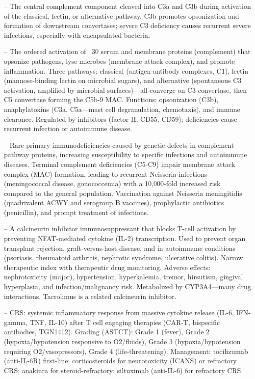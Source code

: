 -- The central complement component cleaved into C3a and C3b during activation of the classical, lectin, or alternative pathway. C3b promotes opsonization and formation of downstream convertases; severe C3 deficiency causes recurrent severe infections, especially with encapsulated bacteria.

-- The ordered activation of ~30 serum and membrane proteins (complement) that opsonize pathogens, lyse microbes (membrane attack complex), and promote inflammation. Three pathways: classical (antigen-antibody complexes, C1), lectin (mannose-binding lectin on microbial sugars), and alternative (spontaneous C3 activation, amplified by microbial surfaces)—all converge on C3 convertase, then C5 convertase forming the C5b-9 MAC. Functions: opsonization (C3b), anaphylatoxins (C3a, C5a—mast cell degranulation, chemotaxis), and immune clearance. Regulated by inhibitors (factor H, CD55, CD59); deficiencies cause recurrent infection or autoimmune disease.

-- Rare primary immunodeficiencies caused by genetic defects in complement pathway proteins, increasing susceptibility to specific infections and autoimmune diseases. Terminal complement deficiencies (C5-C9) impair membrane attack complex (MAC) formation, leading to recurrent Neisseria infections (meningococcal disease, gonococcemia) with a 10,000-fold increased risk compared to the general population. Vaccination against Neisseria meningitidis (quadrivalent ACWY and serogroup B vaccines), prophylactic antibiotics (penicillin), and prompt treatment of infections.

-- A calcineurin inhibitor immunosuppressant that blocks T-cell activation by preventing NFAT-mediated cytokine (IL-2) transcription. Used to prevent organ transplant rejection, graft-versus-host disease, and in autoimmune conditions (psoriasis, rheumatoid arthritis, nephrotic syndrome, ulcerative colitis). Narrow therapeutic index with therapeutic drug monitoring. Adverse effects: nephrotoxicity (major), hypertension, hyperkalemia, tremor, hirsutism, gingival hyperplasia, and infection/malignancy risk. Metabolized by CYP3A4—many drug interactions. Tacrolimus is a related calcineurin inhibitor.

-- CRS: systemic inflammatory response from massive cytokine release (IL-6, IFN-gamma, TNF, IL-10) after T cell engaging therapies (CAR-T, bispecific antibodies, TGN1412). Grading (ASTCT): Grade 1 (fever), Grade 2 (hypoxia/hypotension responsive to O2/fluids), Grade 3 (hypoxia/hypotension requiring O2/vasopressors), Grade 4 (life-threatening). Management: tocilizumab (anti-IL-6R) first-line; corticosteroids for neurotoxicity (ICANS) or refractory CRS; anakinra for steroid-refractory; siltuximab (anti-IL-6) for refractory CRS.

